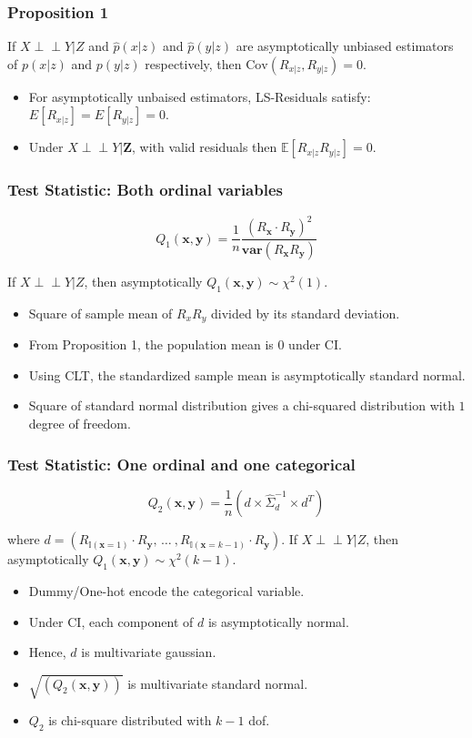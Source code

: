 \documentclass{beamer}
\def\ci{\perp\!\!\!\!\!\perp}
\begin{document}
\begin{frame}
	\frametitle{Proposition 1}
	If $ X \ci Y | Z $ and $ \hat{p}(x|z) $ and $ \hat{p}(y|z) $ are asymptotically
	unbiased estimators of $ p(x|z) $ and $ p(y|z) $ respectively, then 
	$ \mathrm{Cov}(R_{x|z}, R_{y|z}) = 0 $.	
	\vspace{1em}

	\begin{itemize}
		\setlength\itemsep{1em}
		\item For asymptotically unbaised estimators, LS-Residuals satisfy:
			$ E[R_{x|z}] = E[R_{y|z}] = 0 $.
		\item Under $ X \ci Y | \bm{Z} $, with valid
			residuals then $ \mathbb{E}[R_{x|z} R_{y|z}] = 0 $.
	\end{itemize}
\end{frame}

\begin{frame}
	\frametitle{Test Statistic: Both ordinal variables}
	$$ Q_1(\bm{x}, \bm{y}) = \frac{1}{n} \frac{(R_{\bm{x}} \cdot R_{\bm{y}})^2}{\bm{var}(R_{\bm{x}} R_{\bm{y}})} $$

	If $ X \ci Y | Z $, then asymptotically $ Q_1(\bm{x}, \bm{y}) \sim \chi^2(1) $.

	\begin{itemize}
		\setlength\itemsep{1em}
		\item Square of sample mean of $ R_x R_y $ divided by its
			standard deviation.
		\item From Proposition 1, the population mean is 0 under CI.
		\item Using CLT, the standardized sample mean is asymptotically
			standard normal.
		\item Square of standard normal distribution gives a
			chi-squared distribution with $ 1 $ degree of freedom.
	\end{itemize}
\end{frame}

\begin{frame}
	\frametitle{Test Statistic: One ordinal and one categorical}
	$$ Q_2(\bm{x}, \bm{y}) = \frac{1}{n} (d \times \hat{\Sigma}_d^{-1} \times d^T) $$

	where $ d = (R_{\mathbb{I}(\mathbf{x}=1)} \cdot R_{\mathbf{y}}, \, \ldots \ ,
		R_{\mathbb{I}(\mathbf{x}=k-1)} \cdot R_{\mathbf{y}})$.
	If $ X \ci Y | Z $, then asymptotically $ Q_1(\bm{x}, \bm{y}) \sim \chi^2(k-1) $.
	\begin{itemize}
		\setlength\itemsep{1em}
		\item Dummy/One-hot encode the categorical variable.
		\item Under CI, each component of $ d $ is asymptotically normal.
		\item Hence, $ d $ is multivariate gaussian.
		\item $ \sqrt{(Q_2(\bm{x}, \bm{y}))} $ is multivariate standard normal.
		\item $ Q_2 $ is chi-square distributed with $ k-1 $ dof.
	\end{itemize}
\end{frame}
\end{document}
